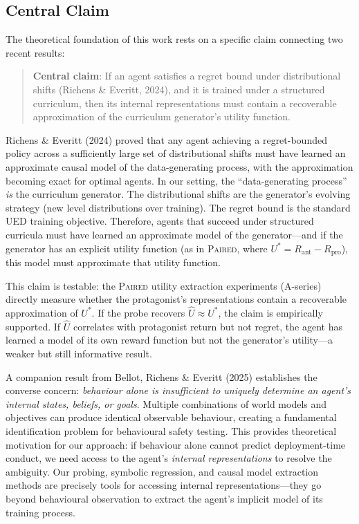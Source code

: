 \documentclass[11pt,a4paper]{article}
\theoremstyle{remark}
\newcommand{\paired}{\textsc{Paired}}
\newcommand{\Uhat}{\hat{U}}
\newcommand{\Ustar}{U^*}
\newcommand{\Rpro}{R_{\text{pro}}}
\newcommand{\Rant}{R_{\text{ant}}}
\begin{document}
\subsection{Central Claim}

The theoretical foundation of this work rests on a specific claim connecting two recent results:

\begin{quote}
\textbf{Central claim}: If an agent satisfies a regret bound under distributional shifts (Richens \& Everitt, 2024), and it is trained under a structured curriculum, then its internal representations must contain a recoverable approximation of the curriculum generator's utility function.
\end{quote}

Richens \& Everitt (2024) proved that any agent achieving a regret-bounded policy across a sufficiently large set of distributional shifts must have learned an approximate causal model of the data-generating process, with the approximation becoming exact for optimal agents. In our setting, the ``data-generating process'' \textit{is} the curriculum generator. The distributional shifts are the generator's evolving strategy (new level distributions over training). The regret bound is the standard UED training objective. Therefore, agents that succeed under structured curricula must have learned an approximate model of the generator---and if the generator has an explicit utility function (as in \paired{}, where $\Ustar = \Rant - \Rpro$), this model must approximate that utility function.

This claim is testable: the \paired{} utility extraction experiments (A-series) directly measure whether the protagonist's representations contain a recoverable approximation of $\Ustar$. If the probe recovers $\Uhat \approx \Ustar$, the claim is empirically supported. If $\Uhat$ correlates with protagonist return but not regret, the agent has learned a model of its own reward function but not the generator's utility---a weaker but still informative result.

A companion result from Bellot, Richens \& Everitt (2025) establishes the converse concern: \textit{behaviour alone is insufficient to uniquely determine an agent's internal states, beliefs, or goals}. Multiple combinations of world models and objectives can produce identical observable behaviour, creating a fundamental identification problem for behavioural safety testing. This provides theoretical motivation for our approach: if behaviour alone cannot predict deployment-time conduct, we need access to the agent's \textit{internal representations} to resolve the ambiguity. Our probing, symbolic regression, and causal model extraction methods are precisely tools for accessing internal representations---they go beyond behavioural observation to extract the agent's implicit model of its training process.
\end{document}
